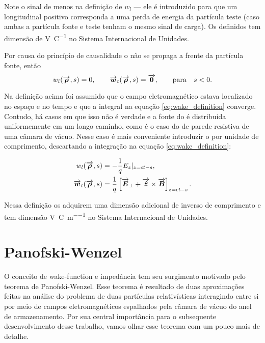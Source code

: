 \documentclass[
	12pt,				%
	openright,			%
	oneside,			%
	a4paper,		%
	chapter=TITLE,		%
	section=TITLE,		%
    brazil,				%
	english,			%
	sumario=tradicional,
	]{abntex2}
\begin{document}
Note o sinal de menos na definição de $w_l$ --- ele é introduzido para que um  longitudinal positivo corresponda a uma perda de energia da partícula teste (caso ambas a partícula fonte e teste tenham o mesmo sinal de carga). Os  definidos tem dimensão de \si{\volt\per\coulomb} no Sistema Internacional de Unidades.

Por causa do princípio de causalidade o  não se propaga a frente da partícula fonte, então
\begin{equation}
    w_l(\overrightarrow{\boldsymbol{\rho}},s) = 0, \qquad \overrightarrow{\boldsymbol{w}}_t(\overrightarrow{\boldsymbol{\rho}},s) = \overrightarrow{\boldsymbol{0}}, \qquad \mathrm{para } \quad s < 0.
\end{equation}

Na definição acima foi assumido que o campo eletromagnético estava localizado no espaço e no tempo e que a integral na equação \ref{eq:wake_definition} converge. Contudo, há casos em que isso não é verdade e a fonte do  é distribuida uniformemente em um longo caminho, como é o caso do  de parede resistiva de uma câmara de vácuo. Nesse caso é mais conveniente introduzir o  por unidade de comprimento, descartando a integração na equação \ref{eq:wake_definition}:

\begin{equation}\begin{aligned}
    w_l(\overrightarrow{\boldsymbol{\rho}},s) &= -\frac1q E_z|_{z=ct-s}, \\
    \overrightarrow{\boldsymbol{w}}_t(\overrightarrow{\boldsymbol{\rho}},s) &= \frac1q\left[\overrightarrow{\boldsymbol{E}}_\perp + \overrightarrow{\boldsymbol{\hat{z}}}\times \overrightarrow{\boldsymbol{B}}\right]_{z=ct-s}.
\end{aligned}\end{equation}

Nessa definição os  adquirem uma dimensão adicional de inverso de comprimento e tem dimensão \si{\volt\per\coulomb\per\meter} no Sistema Internacional de Unidades.

\section{Panofski-Wenzel}

O conceito de wake-function e impedância tem seu surgimento motivado pelo teorema de Panofski-Wenzel. Esse teorema é resultado de duas aproximações feitas na análise do problema de duas partículas relativísticas interagindo entre si por meio de campos eletromagnéticos espalhados pela câmara de vácuo do anel de armazenamento. Por sua central importância para o subsequente desenvolvimento desse trabalho, vamos olhar esse teorema com um pouco mais de detalhe.
\end{document}
